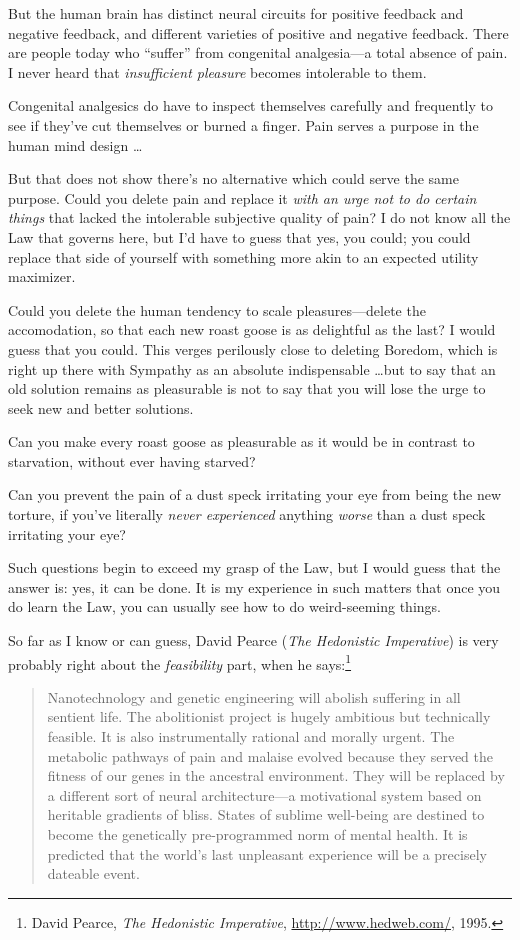 {
 But the human brain has distinct neural circuits for positive
feedback and negative feedback, and different varieties of positive and
negative feedback. There are people today who
``suffer'' from congenital
analgesia---a total absence of pain. I never heard that
\textit{insufficient pleasure} becomes intolerable to them.}

{
 Congenital analgesics do have to inspect themselves carefully and
frequently to see if they've cut themselves or burned a
finger. Pain serves a purpose in the human mind design \ldots}

{
 But that does not show there's no alternative
which could serve the same purpose. Could you delete pain and replace
it \textit{with an urge not to do certain things} that lacked the
intolerable subjective quality of pain? I do not know all the Law that
governs here, but I'd have to guess that yes, you
could; you could replace that side of yourself with something more akin
to an expected utility maximizer.}

{
 Could you delete the human tendency to scale pleasures---delete
the accomodation, so that each new roast goose is as delightful as the
last? I would guess that you could. This verges perilously close to
deleting Boredom, which is right up there with Sympathy as an absolute
indispensable \ldots but to say that an old solution remains as
pleasurable is not to say that you will lose the urge to seek new and
better solutions.}

{
 Can you make every roast goose as pleasurable as it would be in
contrast to starvation, without ever having starved?}

{
 Can you prevent the pain of a dust speck irritating your eye from
being the new torture, if you've literally
\textit{never experienced} anything \textit{worse} than a dust speck
irritating your eye?}

{
 Such questions begin to exceed my grasp of the Law, but I would
guess that the answer is: yes, it can be done. It is my experience in
such matters that once you do learn the Law, you can usually see how to
do weird-seeming things.}

{
 So far as I know or can guess, David Pearce (\textit{The
Hedonistic Imperative}) is very probably right about the
\textit{feasibility} part, when he says:\footnote{David Pearce, \textit{The Hedonistic Imperative},
\url{http://www.hedweb.com/}, 1995.}}

\begin{quote}
{
 Nanotechnology and genetic engineering will abolish suffering in
all sentient life. The abolitionist project is hugely ambitious but
technically feasible. It is also instrumentally rational and morally
urgent. The metabolic pathways of pain and malaise evolved because they
served the fitness of our genes in the ancestral environment. They will
be replaced by a different sort of neural architecture---a motivational
system based on heritable gradients of bliss. States of sublime
well-being are destined to become the genetically pre-programmed norm
of mental health. It is predicted that the world's last
unpleasant experience will be a precisely dateable event.}
\end{quote}

